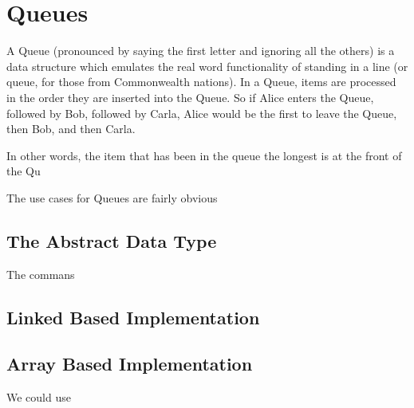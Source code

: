 
\chapter{Queues}
\label{chap-queue}

A Queue (pronounced by saying the first letter and ignoring all the others) is a data structure which emulates the real word functionality of standing in a line (or queue, for those from Commonwealth nations).  
In a Queue, items are processed in the order they are inserted into the Queue.  So if Alice enters the Queue, followed by Bob, followed by Carla, Alice would be the first to leave the Queue, then Bob, and then Carla.

In other words, the item that has been in the queue the longest is at the front of the Qu

The use cases for Queues are fairly obvious

\section{The Abstract Data Type}
The commans

\section{Linked Based Implementation} 
\section{Array Based Implementation}
We could use 